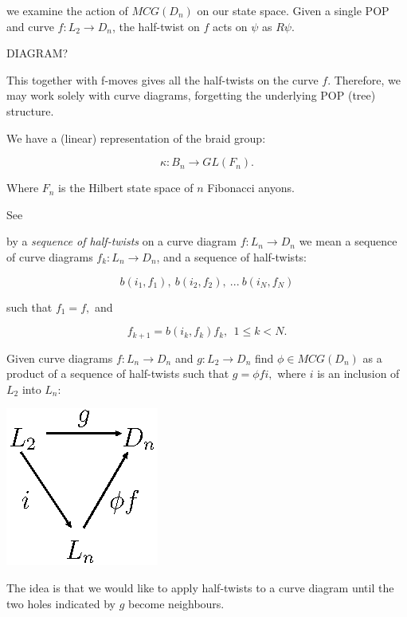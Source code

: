 \documentclass[11pt,a4paper]{article}
\begin{document}
 we examine the action of $MCG(D_n)$
on our state space. Given a single POP and curve $f:L_2\to D_n$,
the half-twist on $f$ acts on $\psi$ as $R\psi$.

DIAGRAM?

This together with f-moves gives all the half-twists on
the curve $f$. Therefore, we may work solely with curve
diagrams, forgetting the underlying POP (tree) structure.

We have a (linear) representation of the braid group:

    $$ \kappa : B_n \to GL(F_n).$$

Where $F_n$ is the Hilbert state space of $n$ Fibonacci anyons.

See \cite{Pfeifer12, Pfeifer14}




 by a {\it sequence of half-twists} on a curve
diagram $f:L_n\to D_n$ we mean a
sequence of curve diagrams $f_k: L_n\to D_n$, and a sequence of half-twists:

        $$ b(i_1, f_1),\ b(i_2, f_2),\ ...\ b(i_N, f_N) $$

such that $f_1=f,$ and

        $$ f_{k+1} = b(i_k, f_k) f_k,\ \  \text{} 1\leq k<N.$$


Given curve diagrams $f:L_n\to D_n$ and $g:L_2\to D_n$
find $\phi\in MCG(D_n)$ as a product of
a sequence of half-twists such that
$g = \phi f i,$ where $i$ is an inclusion of $L_2$ into $L_n:$

\begin{center}
\includegraphics{halftwist-factor.eps}
\end{center}

The idea is that we would like to apply half-twists to a curve diagram
until the two holes indicated by $g$ become neighbours.
\end{document}
